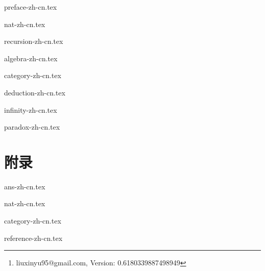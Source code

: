 \documentclass[UTF8, 8pt, b5paper,twoside]{extbook}
\begin{document}
\author{刘新宇
  \thanks{ liuxinyu95@gmail.com, Version: 0.6180339887498949}
}

\maketitle

{preface-zh-cn.tex}


\tableofcontents
\newpage

{nat-zh-cn.tex}

{recursion-zh-cn.tex}

{algebra-zh-cn.tex}

{category-zh-cn.tex}

{deduction-zh-cn.tex}

{infinity-zh-cn.tex}

{paradox-zh-cn.tex}

\part{附录}
\appendix
\noappendicestocpagenum
\addappheadtotoc

{ans-zh-cn.tex}

{nat-zh-cn.tex}

{category-zh-cn.tex}

{reference-zh-cn.tex}

\printindex


\end{document}
